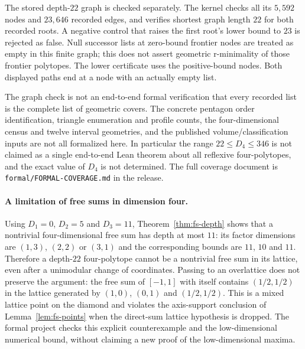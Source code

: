 \documentclass[manuscript]{aomart}
\theoremstyle{definition}
\theoremstyle{remark}
\begin{document}
The stored depth-$22$ graph is checked separately. The kernel checks
all its $5{,}592$ nodes and $23{,}646$ recorded edges, and verifies
shortest graph length $22$ for both recorded roots. A negative control
that raises the first root's lower bound to $23$ is rejected as false.
Null successor lists at zero-bound frontier nodes are treated as empty
in this finite graph; this does not assert geometric r-minimality of
those frontier polytopes. The lower certificate uses the positive-bound
nodes. Both displayed paths end at a node with an actually empty list.

The graph check is not an end-to-end formal verification that every
recorded list is the complete list of geometric covers. The concrete
pentagon order identification, triangle enumeration and profile counts,
the four-dimensional census and twelve interval geometries, and the
published volume/classification inputs are not all formalized here.
In particular the range $22\le D_4\le346$ is not claimed as a single
end-to-end Lean theorem about all reflexive four-polytopes, and the exact
value of $D_4$ is not determined. The full coverage document is
\texttt{formal/FORMAL-COVERAGE.md} in the release.

\paragraph*{A limitation of free sums in dimension four.}
Using $D_1=0$, $D_2=5$ and $D_3=11$, Theorem~\ref{thm:fs-depth}
shows that a nontrivial four-dimensional free sum has depth at most
$11$: its factor dimensions are $(1,3)$, $(2,2)$ or $(3,1)$ and the
corresponding bounds are $11$, $10$ and $11$. Therefore a depth-$22$
four-polytope cannot be a nontrivial free sum in its lattice, even
after a unimodular change of coordinates. Passing to an overlattice
does not preserve the argument: the free sum of $[-1,1]$ with itself
contains $(1/2,1/2)$ in the lattice generated by $(1,0)$, $(0,1)$
and $(1/2,1/2)$. This is a mixed lattice point on the diamond and
violates the axis-support conclusion of Lemma~\ref{lem:fs-points}
when the direct-sum lattice hypothesis is dropped. The formal project
checks this explicit counterexample and the low-dimensional numerical
bound, without claiming a new proof of the low-dimensional maxima.
\end{document}
